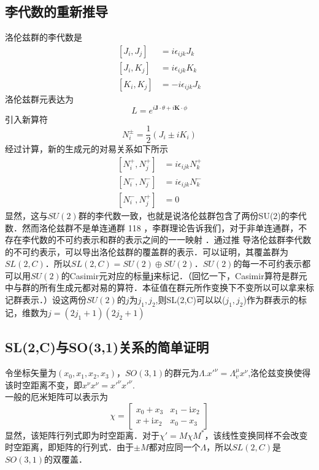 \subsection{李代数的重新推导}
洛伦兹群的李代数是
\begin{equation}
\begin{aligned}
\left[J_{i}, J_{j}\right] &=i \epsilon_{i j k} J_{k} \\
\left[J_{i}, K_{j}\right] &=i \epsilon_{i j k} K_{k} \\
\left[K_{i}, K_{j}\right] &=-i \epsilon_{i j k} J_{k}
\end{aligned}
\end{equation}
洛伦兹群元表达为
\begin{equation}
L=e^{i \mathbf{J} \cdot \theta+i \mathbf{K} \cdot \phi}
\end{equation}
引入新算符
\begin{equation}
N_{i}^{\pm}=\frac{1}{2}\left(J_{i} \pm i K_{i}\right)
\end{equation}
经过计算，新的生成元的对易关系如下所示
\begin{equation}
\begin{aligned}
\left[N_{i}^{+}, N_{j}^{+}\right] &=i \epsilon_{i j k} N_{k}^{+} \\
\left[N_{i}^{-}, N_{j}^{-}\right] &=i \epsilon_{i j k} N_{k}^{-} \\
\left[N_{i}^{-}, N_{j}^{+}\right] &=0
\end{aligned}
\end{equation}
显然，这与$SU(2)$群的李代数一致，也就是说洛伦兹群包含了两份SU(2)的李代数．然而洛伦兹群不是单连通群 118 ，李群理论告诉我们，对于非单连通群，不存在李代数的不可约表示和群的表示之间的一一映射 ．通过推
导洛伦兹群李代数的不可约表示，可以导出洛伦兹群的覆盖群的表示．可以证明，其覆盖群为$SL(2,C)$．所以$SL(2,C)=SU(2)\oplus SU(2)$．$SU(2)$的每一不可约表示都可以用$SU(2)$的Casimir元对应的标量\textbf{j}来标记．（回忆一下，Casimir算符是群元中与群的所有生成元都对易的算符．本征值在群元所作变换下不变所以可以拿来标记群表示．）设这两份$SU(2)$的$j$为$j_1,j_2$,则SL(2,C)可以以($j_1,j_2$)作为群表示的标记，维数为$j=(2j_1+1)(2j_2+1)$
\subsection{SL(2,C)与SO(3,1)关系的简单证明}
令坐标矢量为$(x_0,x_1,x_2,x_3)$，$SO(3,1)$的群元为$\Lambda$.$x'^{\nu}=\Lambda_{v}^{\mu} x^{\nu}$,洛伦兹变换使得该时空距离不变，即$x^\nu x^\nu=x'^\nu x'^\nu$.
\\一般的厄米矩阵可以表示为
\begin{equation}
\chi=\left[\begin{array}{cc}
x_0+x_3 & x_1-\mathrm{i} x_2 \\
x+\mathrm{i}x_2 & x_0-x_3
\end{array}\right]
\end{equation}
显然，该矩阵行列式即为时空距离．对于$\chi'=M \chi M^{*}$，该线性变换同样不会改变时空距离，即矩阵的行列式．由于$\pm M$都对应同一个$\Lambda$，所以$SL(2,C)$是$SO(3,1)$的双覆盖．
